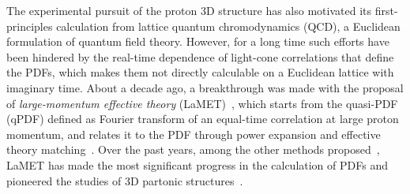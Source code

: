 \documentclass[prd,twocolumn,preprintnumbers,showpacs,nofootinbib,superscriptaddress,notitlepage,floatfix]{revtex4-1}
\begin{document}
The experimental pursuit of the proton 3D structure has also motivated its first-principles calculation from lattice quantum chromodynamics (QCD), a Euclidean formulation of quantum field theory. However, for a long time such efforts have been hindered by the real-time dependence of light-cone correlations that define the PDFs, which makes them not directly calculable on a Euclidean lattice with imaginary time.
About a decade ago, a breakthrough was made with the proposal of \textit{large-momentum effective theory} (LaMET)~\cite{Ji:2013dva,Ji:2014gla,Ji:2020ect}, which starts from the quasi-PDF (qPDF) defined as Fourier transform of an equal-time correlation at large proton momentum, and relates it to the PDF through power expansion and effective theory matching~\cite{Ji:2020byp}. Over the past years, among the other methods proposed~\cite{Liu:1993cv,Detmold:2005gg,Braun:2007wv,Chambers:2017dov,Radyushkin:2017cyf,Ma:2017pxb}, LaMET has made the most significant progress in the calculation of PDFs and pioneered the studies of 3D partonic structures~\cite{Ji:2020ect,Constantinou:2020hdm,Boussarie:2023izj}.
\end{document}
